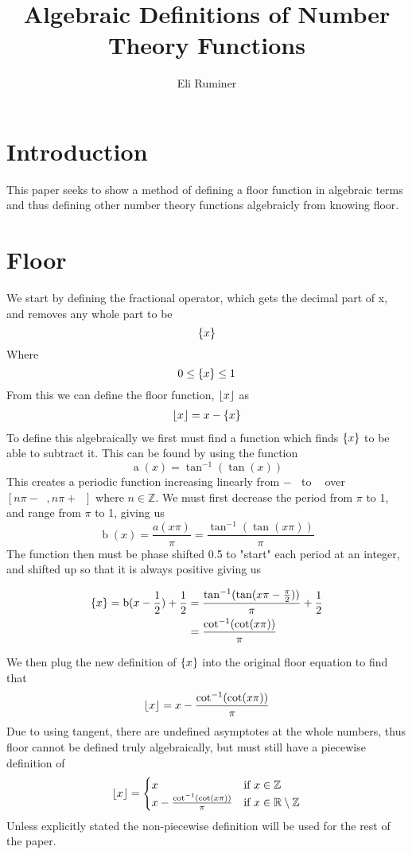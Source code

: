 \documentclass[11pt]{article}
\title{Algebraic Definitions of Number Theory Functions}
\author{Eli Ruminer}
\date{}
\DeclarePairedDelimiter\floor{\lfloor}{\rfloor}
\DeclarePairedDelimiter\fractional{\{}{\}}
\DeclareMathOperator{\hp}{\frac{\pi}{2}}
\newcommand{\fractionalAlg}{\frac{\cot^{\mathrm{-1}}(\cot(x\pi))}{\pi}}
\begin{document}
\begin{titlepage}
\clearpage\maketitle
\thispagestyle{empty}
\end{titlepage}

\tableofcontents
\newpage

\section{Introduction}
This paper seeks to show a method of defining a floor function in algebraic terms and thus defining other number theory functions algebraicly from knowing floor.

\section{Floor}
We start by defining the fractional operator, which gets the decimal part of x, and removes any whole part to be \[\fractional*{x}\]
Where\[0\leq\fractional*{x}\leq1\]
From this we can define the floor function, \(\floor*{x}\) as
\begin{gather*}
\floor*{x}=x-\fractional*{x}
\end{gather*}
To define this algebraically we first must find a function which finds \(\fractional*{x}\) to be able to subtract it. This can be found by using the function
\[\operatorname{a}(x)=\tan^{\mathrm{-1}}(\tan(x))\]
This creates a periodic function increasing linearly from \(-\hp\) to \(\hp\) over \([n\pi-\hp,n\pi+\hp]\) where \(n\in\mathbb{Z}\). We must first decrease the period from \(\pi\) to 1, and range from \(\pi\) to 1, giving us
\[\operatorname{b}(x)=\frac{a(x\pi)}{\pi}=\frac{\tan^{\mathrm{-1}}(\tan(x\pi))}{\pi}\]
The function then must be phase shifted 0.5 to "start" each period at an integer, and shifted up so that it is always positive giving us

\begin{align*}
\fractional*{x}=\operatorname{b}(x-\frac{1}{2}) + \frac{1}{2} & =\frac{\tan^{\mathrm{-1}}(\tan(x\pi-\frac{\pi}{2}))}{\pi}+\frac{1}{2}\\
& = \fractionalAlg
\end{align*}

We then plug the new definition of \(\fractional*{x}\) into the original floor equation to find that
\[\floor*{x}=x-\fractionalAlg\]
Due to using tangent, there are undefined asymptotes at the whole numbers, thus floor cannot be defined truly algebraically, but must still have a piecewise definition of
\begin{gather*}
\floor*{x}=\begin{cases}
x & \text{if } x \in \mathbb{Z}\\
x-\fractionalAlg & \text{if } x \in \mathbb{R}\setminus\mathbb{Z}\\
\end{cases}
\end{gather*}
Unless explicitly stated the non-piecewise definition will be used for the rest of the paper.
\end{document}
